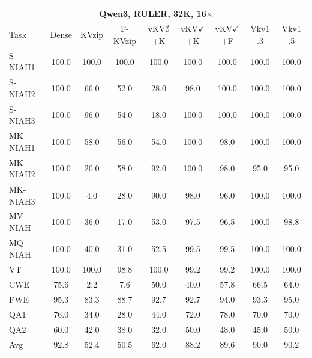 \begin{tabular}{lcccccccc}
\toprule
\multicolumn{9}{c}{Qwen3, RULER, 32K, 16$\times$} \\
\midrule
Task & Dense & KVzip & F-KVzip & vKV$\emptyset$+K & vKV$\checkmark$+K & vKV$\checkmark$+F & Vkv1 .3 & Vkv1 .5 \\
\midrule
S-NIAH1 & 100.0 & 100.0 & 100.0 & 100.0 & 100.0 & 100.0 & 100.0 & 100.0 \\
S-NIAH2 & 100.0 & 66.0 & 52.0 & 28.0 & 98.0 & 100.0 & 100.0 & 100.0 \\
S-NIAH3 & 100.0 & 96.0 & 54.0 & 18.0 & 100.0 & 100.0 & 100.0 & 100.0 \\
MK-NIAH1 & 100.0 & 58.0 & 56.0 & 54.0 & 100.0 & 98.0 & 100.0 & 100.0 \\
MK-NIAH2 & 100.0 & 20.0 & 58.0 & 92.0 & 100.0 & 98.0 & 95.0 & 95.0 \\
MK-NIAH3 & 100.0 & 4.0 & 28.0 & 90.0 & 98.0 & 96.0 & 100.0 & 100.0 \\
MV-NIAH & 100.0 & 36.0 & 17.0 & 53.0 & 97.5 & 96.5 & 100.0 & 98.8 \\
MQ-NIAH & 100.0 & 40.0 & 31.0 & 52.5 & 99.5 & 99.5 & 100.0 & 100.0 \\
VT & 100.0 & 100.0 & 98.8 & 100.0 & 99.2 & 99.2 & 100.0 & 100.0 \\
CWE & 75.6 & 2.2 & 7.6 & 50.0 & 40.0 & 57.8 & 66.5 & 64.0 \\
FWE & 95.3 & 83.3 & 88.7 & 92.7 & 92.7 & 94.0 & 93.3 & 95.0 \\
QA1 & 76.0 & 34.0 & 28.0 & 44.0 & 72.0 & 78.0 & 70.0 & 70.0 \\
QA2 & 60.0 & 42.0 & 38.0 & 32.0 & 50.0 & 48.0 & 45.0 & 50.0 \\
\midrule
Avg & 92.8 & 52.4 & 50.5 & 62.0 & 88.2 & 89.6 & 90.0 & 90.2 \\
\bottomrule
\end{tabular}
\vspace{0.8em}

